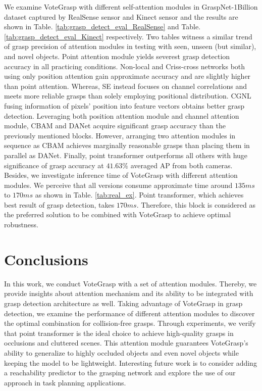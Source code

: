 We examine VoteGrasp with different self-attention modules in GraspNet-1Billion dataset captured by RealSense sensor and Kinect sensor and the results are shown in Table. \ref{tab:grasp_detect_eval_RealSense} and Table. \ref{tab:grasp_detect_eval_Kinect} respectively. Two tables witness a similar trend of grasp precision of attention modules in testing with seen, unseen (but similar), and novel objects. Point attention module yields severest grasp detection accuracy in all practicing conditions. Non-local and Criss-cross networks both using only position attention gain approximate accuracy and are slightly higher than point attention. Whereas, SE instead focuses on channel correlations and meets more reliable grasps than solely employing positional distribution. CGNL fusing information of pixels' position into feature vectors obtains better grasp detection. Leveraging both position attention module and channel attention module, CBAM and DANet acquire significant grasp accuracy than the previously mentioned blocks. However, arranging two attention modules in sequence as CBAM achieves marginally reasonable grasps than placing them in parallel as DANet. Finally, point transformer outperforms all others with huge significance of grasp accuracy at $41.63\%$ averaged AP from both cameras. Besides, we investigate inference time of VoteGrasp with different attention modules. We perceive that all versions consume approximate time around $135ms$ to $170ms$ as shown in Table. \ref{tab:real_ex}. Point transformer, which achieves best result of grasp detection, takes $170ms$. Therefore, this block is considered as the preferred solution to be combined with VoteGrasp to achieve optimal robustness. 

\section{Conclusions}

In this work, we conduct VoteGrasp with a set of attention modules. Thereby, we provide insights about attention mechanism and its ability to be integrated with grasp detection architecture as well. Taking advantage of VoteGrasp in grasp detection, we examine the performance of different attention modules to discover the optimal combination for collision-free grasps. Through experiments, we verify that point transformer is the ideal choice to achieve high-quality grasps in occlusions and cluttered scenes. This attention module guarantees VoteGrasp's ability to generalize to highly occluded objects and even novel objects while keeping the model to be lightweight. Interesting future work is to consider adding a reachability predictor to the grasping network and explore the use of our approach in task planning applications.
